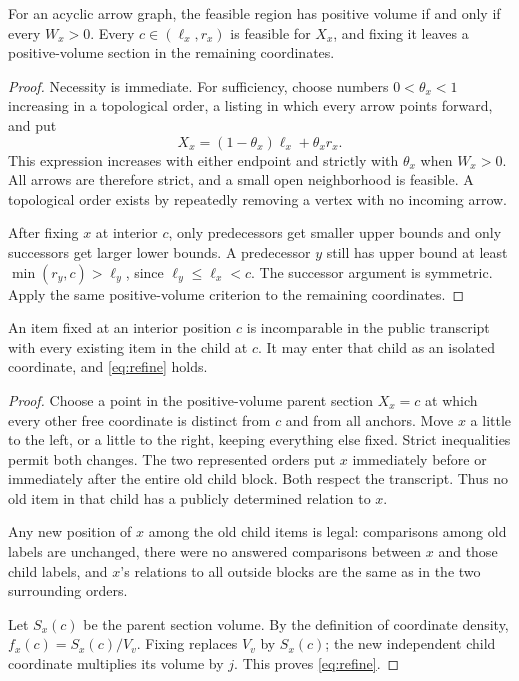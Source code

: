 \begin{lemma}\label{lem:interior}
For an acyclic arrow graph, the feasible region has positive volume if and only if every \(W_x>0\). Every \(c\in(\ell_x,r_x)\) is feasible for \(X_x\), and fixing it leaves a positive-volume section in the remaining coordinates.
\end{lemma}
\begin{proof}
Necessity is immediate. For sufficiency, choose numbers \(0<\theta_x<1\) increasing in a topological order, a listing in which every arrow points forward, and put
\[
X_x=(1-\theta_x)\ell_x+\theta_xr_x.
\]
This expression increases with either endpoint and strictly with \(\theta_x\) when \(W_x>0\). All arrows are therefore strict, and a small open neighborhood is feasible. A topological order exists by repeatedly removing a vertex with no incoming arrow.

After fixing \(x\) at interior \(c\), only predecessors get smaller upper bounds and only successors get larger lower bounds. A predecessor \(y\) still has upper bound at least \(\min(r_y,c)>\ell_y\), since \(\ell_y\le\ell_x<c\). The successor argument is symmetric. Apply the same positive-volume criterion to the remaining coordinates.
\end{proof}

\begin{lemma}\label{lem:admission}
An item fixed at an interior position \(c\) is incomparable in the public transcript with every existing item in the child at \(c\). It may enter that child as an isolated coordinate, and \eqref{eq:refine} holds.
\end{lemma}
\begin{proof}
Choose a point in the positive-volume parent section \(X_x=c\) at which every other free coordinate is distinct from \(c\) and from all anchors. Move \(x\) a little to the left, or a little to the right, keeping everything else fixed. Strict inequalities permit both changes. The two represented orders put \(x\) immediately before or immediately after the entire old child block. Both respect the transcript. Thus no old item in that child has a publicly determined relation to \(x\).

Any new position of \(x\) among the old child items is legal: comparisons among old labels are unchanged, there were no answered comparisons between \(x\) and those child labels, and \(x\)'s relations to all outside blocks are the same as in the two surrounding orders.

Let \(S_x(c)\) be the parent section volume. By the definition of coordinate density, \(f_x(c)=S_x(c)/V_v\). Fixing replaces \(V_v\) by \(S_x(c)\); the new independent child coordinate multiplies its volume by \(j\). This proves \eqref{eq:refine}.
\end{proof}

